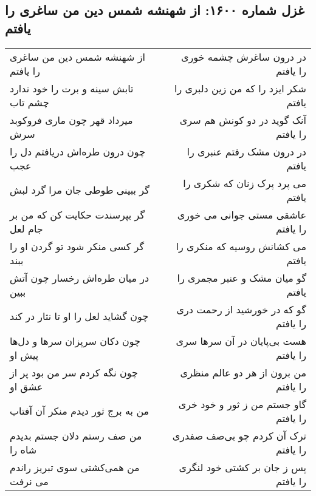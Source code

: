 \begin{center}
\section*{غزل شماره ۱۶۰۰: از شهنشه شمس دین من ساغری را یافتم}
\label{sec:1600}
\begin{longtable}{l p{0.5cm} r}
از شهنشه شمس دین من ساغری را یافتم
&&
در درون ساغرش چشمه خوری را یافتم
\\
تابش سینه و برت را خود ندارد چشم تاب
&&
شکر ایزد را که من زین دلبری را یافتم
\\
میرداد قهر چون ماری فروکوبد سرش
&&
آنک گوید در دو کونش هم سری را یافتم
\\
چون درون طره‌اش دریافتم دل را عجب
&&
در درون مشک رفتم عنبری را یافتم
\\
گر ببینی طوطی جان مرا گرد لبش
&&
می پرد پرک زنان که شکری را یافتم
\\
گر بپرسندت حکایت کن که من بر جام لعل
&&
عاشقی مستی جوانی می خوری را یافتم
\\
گر کسی منکر شود تو گردن او را ببند
&&
می کشانش روسیه که منکری را یافتم
\\
در میان طره‌اش رخسار چون آتش ببین
&&
گو میان مشک و عنبر مجمری را یافتم
\\
چون گشاید لعل را او تا نثار در کند
&&
گو که در خورشید از رحمت دری را یافتم
\\
چون دکان سرپزان سرها و دل‌ها پیش او
&&
هست بی‌پایان در آن سرها سری را یافتم
\\
چون نگه کردم سر من بود پر از عشق او
&&
من برون از هر دو عالم منظری را یافتم
\\
من به برج ثور دیدم منکر آن آفتاب
&&
گاو جستم من ز ثور و خود خری را یافتم
\\
من صف رستم دلان جستم بدیدم شاه را
&&
ترک آن کردم چو بی‌صف صفدری را یافتم
\\
من همی‌کشتی سوی تبریز راندم می نرفت
&&
پس ز جان بر کشتی خود لنگری را یافتم
\\
\end{longtable}
\end{center}
